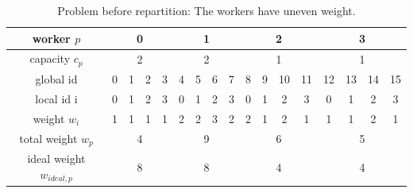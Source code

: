 \begin{table}[H]
	\begin{center}
		\begin{tabular}{ | c | c | c | c | c | c | c | c | c | c | c | c | c | c | c | c | c | } 
			\hline
			worker \(p\) & \multicolumn{4}{c|}{\cellcolor{vs_lightgreen}0} & \multicolumn{4}{c|}{\cellcolor{vs_lightblue}1} & \multicolumn{4}{c|}{\cellcolor{vs_lightred}2} & \multicolumn{4}{c|}{\cellcolor{vs_lightplum}3}  \\
			\hline
			capacity \(c_p\) & \multicolumn{4}{c|}{\cellcolor{vs_lightgreen}2} & \multicolumn{4}{c|}{\cellcolor{vs_lightblue}2} & \multicolumn{4}{c|}{\cellcolor{vs_lightred}1} & \multicolumn{4}{c|}{\cellcolor{vs_lightplum}1}  \\
			\hline
			global id & \cellcolor{vs_lightgreen}0 & \cellcolor{vs_lightgreen}1 & \cellcolor{vs_lightgreen}2 & \cellcolor{vs_lightgreen}3 & \cellcolor{vs_lightblue}4 & \cellcolor{vs_lightblue}5 & \cellcolor{vs_lightblue}6 & \cellcolor{vs_lightblue}7 & \cellcolor{vs_lightred}8 & \cellcolor{vs_lightred}9 & \cellcolor{vs_lightred}10 & \cellcolor{vs_lightred}11 & \cellcolor{vs_lightplum}12 & \cellcolor{vs_lightplum}13 & \cellcolor{vs_lightplum}14 & \cellcolor{vs_lightplum}15 \\ 
			\hline
			local id i & \cellcolor{vs_lightgreen}0 & \cellcolor{vs_lightgreen}1 & \cellcolor{vs_lightgreen}2 & \cellcolor{vs_lightgreen}3 & \cellcolor{vs_lightblue}0 & \cellcolor{vs_lightblue}1 & \cellcolor{vs_lightblue}2 & \cellcolor{vs_lightblue}3 & \cellcolor{vs_lightred}0 & \cellcolor{vs_lightred}1 & \cellcolor{vs_lightred}2 & \cellcolor{vs_lightred}3 & \cellcolor{vs_lightplum}0 & \cellcolor{vs_lightplum}1 & \cellcolor{vs_lightplum}2 & \cellcolor{vs_lightplum}3 \\ 
			\hline
			weight \(w_i\) & \cellcolor{vs_lightgreen}1 & \cellcolor{vs_lightgreen}1 & \cellcolor{vs_lightgreen}1 & \cellcolor{vs_lightgreen}1 & \cellcolor{vs_lightblue}2 & \cellcolor{vs_lightblue}2 & \cellcolor{vs_lightblue}3 & \cellcolor{vs_lightblue}2 & \cellcolor{vs_lightred}2 & \cellcolor{vs_lightred}1 & \cellcolor{vs_lightred}2 & \cellcolor{vs_lightred}1 & \cellcolor{vs_lightplum}1 & \cellcolor{vs_lightplum}1 & \cellcolor{vs_lightplum}2 & \cellcolor{vs_lightplum}1 \\ 
			\hline
			total weight \(w_p\) & \multicolumn{4}{c|}{\cellcolor{vs_lightgreen}4} & \multicolumn{4}{c|}{\cellcolor{vs_lightblue}9} & \multicolumn{4}{c|}{\cellcolor{vs_lightred}6} & \multicolumn{4}{c|}{\cellcolor{vs_lightplum}5} \\ 
			\hline
			ideal weight \(w_{ideal,p}\) & \multicolumn{4}{c|}{\cellcolor{vs_lightgreen}8} & \multicolumn{4}{c|}{\cellcolor{vs_lightblue}8} & \multicolumn{4}{c|}{\cellcolor{vs_lightred}4} & \multicolumn{4}{c|}{\cellcolor{vs_lightplum}4} \\ 
			\hline
		\end{tabular}
	
		\caption{Problem before repartition: The workers have uneven weight.}\label{table:before_repartition}
	\end{center}
\end{table}

